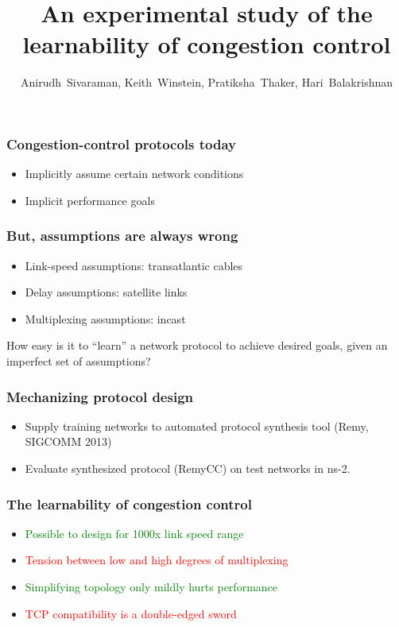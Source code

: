 \documentclass[svgnames]{beamer}
\title{An experimental study of the learnability of congestion control}
\author{Anirudh~Sivaraman, Keith~Winstein, Pratiksha~Thaker, Hari~Balakrishnan}
\institute{MIT CSAIL\vspace{\baselineskip}}
\begin{document}
\begin{frame}

\titlepage

\end{frame}

\begin{Large}
\begin{frame}
\frametitle{Congestion-control protocols today}
\begin{itemize}
\item<2-> Implicitly assume certain network conditions
\item<3-> Implicit performance goals
\end{itemize}
\end{frame}

\begin{frame}
\frametitle{But, assumptions are always wrong}
\begin{itemize}
\item<2-> Link-speed assumptions: transatlantic cables
\item<3-> Delay assumptions: satellite links
\item<4-> Multiplexing assumptions: incast
\end{itemize}
\end{frame}

\begin{frame}
\begin{center}
How easy is it to “learn” a network protocol to achieve desired goals, given
an imperfect set of assumptions?
\end{center}
\end{frame}

\begin{frame}
\frametitle{Mechanizing protocol design}
\begin{itemize}
\item <2->Supply training networks to automated protocol synthesis tool (Remy, SIGCOMM 2013) 
\item <3->Evaluate synthesized protocol (RemyCC) on test networks in ns-2.
\end{itemize}
\end{frame}







 



\begin{frame}
\frametitle{The learnability of congestion control}
\begin{itemize}
\item<1-> \textcolor{green}{Possible to design for 1000x link speed range}
\item<2-> \textcolor{red}{Tension between low and high degrees of multiplexing}
\item<3-> \textcolor{green}{Simplifying topology only mildly hurts performance}
\item<4-> \textcolor{red}{TCP compatibility is a double-edged sword}
\end{itemize}
\end{frame}


\end{Large}
\end{document}
